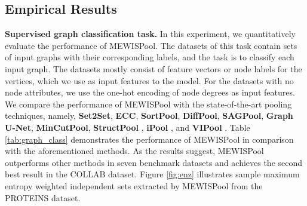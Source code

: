 \documentclass{article}
\begin{document}
\subsection{Empirical Results}
\textbf{Supervised graph classification task.} In this experiment, we quantitatively evaluate the performance of MEWISPool. The datasets of this task contain sets of input graphs with their corresponding labels, and the task is to classify each input graph. The datasets mostly consist of feature vectors or node labels for the vertices, which we use as input features to the model. For the datasets with no node attributes, we use the one-hot encoding of node degrees as input features. We compare the performance of MEWISPool with the state-of-the-art pooling techniques, namely, \textbf{Set2Set}\cite{set2set}, \textbf{ECC}\cite{ecc}, \textbf{SortPool}\cite{dgcnn}, \textbf{DiffPool}\cite{diffpool}, \textbf{SAGPool}\cite{sagpool}, \textbf{Graph U-Net}\cite{gunet}, \textbf{MinCutPool}\cite{mincutpool}, \textbf{StructPool} \cite{structpool}, \textbf{iPool} \cite{ipool}, and \textbf{VIPool} \cite{gxn}. Table \ref{tab:graph_class} demonstrates the performance of MEWISPool in comparison with the aforementioned methods. As the results suggest, MEWISPool outperforms other methods in seven benchmark datasets and achieves the second best result in the COLLAB dataset. Figure \ref{fig:enz} illustrates sample maximum entropy weighted independent sets extracted by MEWISPool from the PROTEINS dataset.
\end{document}
